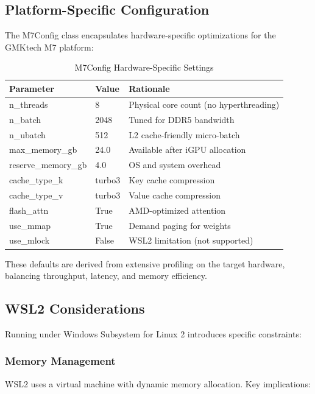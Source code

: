 \subsection{Platform-Specific Configuration}

The M7Config class encapsulates hardware-specific optimizations for the GMKtech M7 platform:

\begin{table}[h]
\centering
\caption{M7Config Hardware-Specific Settings}
\label{tab:m7config_settings}
\begin{tabular}{lll}
\toprule
\textbf{Parameter} & \textbf{Value} & \textbf{Rationale} \\
\midrule
n\_threads & 8 & Physical core count (no hyperthreading) \\
n\_batch & 2048 & Tuned for DDR5 bandwidth \\
n\_ubatch & 512 & L2 cache-friendly micro-batch \\
max\_memory\_gb & 24.0 & Available after iGPU allocation \\
reserve\_memory\_gb & 4.0 & OS and system overhead \\
cache\_type\_k & turbo3 & Key cache compression \\
cache\_type\_v & turbo3 & Value cache compression \\
flash\_attn & True & AMD-optimized attention \\
use\_mmap & True & Demand paging for weights \\
use\_mlock & False & WSL2 limitation (not supported) \\
\bottomrule
\end{tabular}
\end{table}

These defaults are derived from extensive profiling on the target hardware, balancing throughput, latency, and memory efficiency.

\subsection{WSL2 Considerations}

Running under Windows Subsystem for Linux 2 introduces specific constraints:

\subsubsection{Memory Management}

WSL2 uses a virtual machine with dynamic memory allocation. Key implications:

